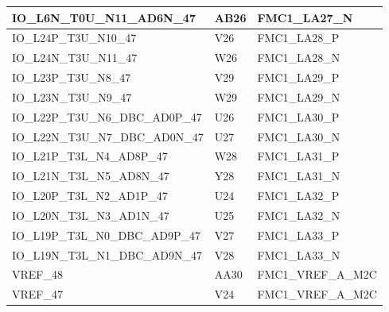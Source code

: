 \begin{footnotesize}
\begin{longtable}{|p{7cm}|p{1cm}|p{5cm}|}
		IO\_L6N\_T0U\_N11\_AD6N\_47	&	AB26	&	FMC1\_LA27\_N	\\ \hline
		IO\_L24P\_T3U\_N10\_47	&	V26	&	FMC1\_LA28\_P	\\ \hline
		IO\_L24N\_T3U\_N11\_47	&	W26	&	FMC1\_LA28\_N	\\ \hline
		IO\_L23P\_T3U\_N8\_47	&	V29	&	FMC1\_LA29\_P	\\ \hline
		IO\_L23N\_T3U\_N9\_47	&	W29	&	FMC1\_LA29\_N	\\ \hline
		IO\_L22P\_T3U\_N6\_DBC\_AD0P\_47	&	U26	&	FMC1\_LA30\_P	\\ \hline
		IO\_L22N\_T3U\_N7\_DBC\_AD0N\_47	&	U27	&	FMC1\_LA30\_N	\\ \hline
		IO\_L21P\_T3L\_N4\_AD8P\_47	&	W28	&	FMC1\_LA31\_P	\\ \hline
		IO\_L21N\_T3L\_N5\_AD8N\_47	&	Y28	&	FMC1\_LA31\_N	\\ \hline
		IO\_L20P\_T3L\_N2\_AD1P\_47	&	U24	&	FMC1\_LA32\_P	\\ \hline
		IO\_L20N\_T3L\_N3\_AD1N\_47	&	U25	&	FMC1\_LA32\_N	\\ \hline
		IO\_L19P\_T3L\_N0\_DBC\_AD9P\_47	&	V27	&	FMC1\_LA33\_P	\\ \hline
		IO\_L19N\_T3L\_N1\_DBC\_AD9N\_47	&	V28	&	FMC1\_LA33\_N	\\ \hline
		VREF\_48	&	AA30	&	FMC1\_VREF\_A\_M2C	\\ \hline
		VREF\_47	&	V24	&	FMC1\_VREF\_A\_M2C	\\ \hline
		
	\end{longtable}
\end{footnotesize}